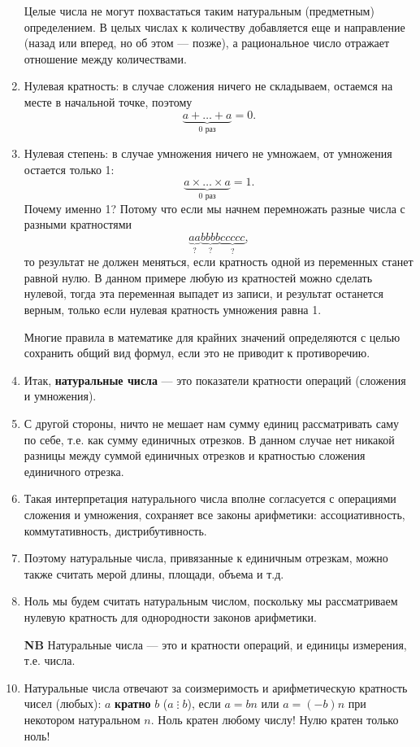\begin{enumerate}
Целые числа не могут похвастаться таким натуральным (предметным) определением. В целых числах к количеству добавляется еще и направление (назад или вперед, но об этом --- позже), а рациональное число отражает отношение между количествами.

\item Нулевая кратность: в случае сложения ничего не складываем, остаемся на месте в начальной точке, поэтому
$$
\underbrace{a+\dots+a}_{0\mbox{ раз}}=0.
$$
\item Нулевая степень: в случае умножения ничего не умножаем, от умножения остается только 1:
$$
\underbrace{a\times\dots\times a}_{0\mbox{ раз}}=1.
$$
Почему именно 1? Потому что если мы начнем перемножать разные числа с разными кратностями
$$
\underbrace{aa}_{?}\underbrace{bbbb}_{?}\underbrace{ccccc}_{?},
$$
то результат не должен меняться, если кратность одной из переменных станет равной нулю. В данном примере любую из кратностей можно сделать нулевой, тогда эта переменная выпадет из записи, и результат останется верным, только если нулевая кратность умножения равна 1.

Многие правила в математике для крайних значений определяются с целью сохранить общий вид формул, если это не приводит к противоречию.
\item Итак, \textbf{натуральные числа} --- это показатели кратности операций (сложения и умножения).
\item С другой стороны, ничто не мешает нам сумму единиц рассматривать саму по себе, т.е. как сумму единичных отрезков. В данном случае нет никакой разницы между суммой единичных отрезков и кратностью сложения единичного отрезка.
\item Такая интерпретация натурального числа вполне согласуется с операциями сложения и умножения, сохраняет все законы арифметики: ассоциативность, коммутативность, дистрибутивность.
\item Поэтому натуральные числа, привязанные к единичным отрезкам, можно также считать мерой длины, площади, объема и т.д.
\item Ноль мы будем считать натуральным числом, поскольку мы рассматриваем нулевую кратность для однородности законов арифметики.
\item[\bf NB] Натуральные числа --- это и кратности операций, и единицы измерения, т.е. числа.
\item Натуральные числа отвечают за соизмеримость и арифметическую кратность чисел (любых): $a$ \textbf{кратно} $b$ ($a\mathop{\vdots} b$), если $a=bn$ или $a=(-b)n$ при некотором натуральном $n$. Ноль кратен любому числу! Нулю кратен только ноль!


\end{enumerate}
